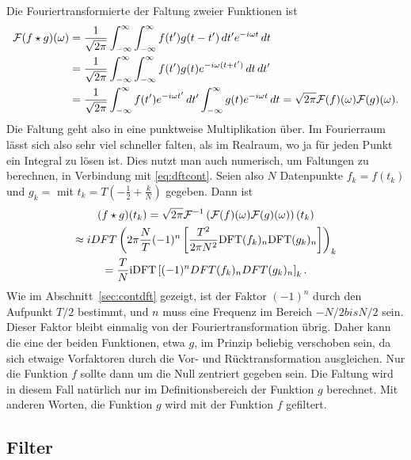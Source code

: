 Die Fouriertransformierte der Faltung zweier Funktionen ist
\begin{equation}
  \label{eq:fourierfaltung}
  \begin{split}
    \mathcal F(f\star g)(\omega) &=
    \frac{1}{\sqrt{2\pi}}\int_{-\infty}^{\infty}
    \int_{-\infty}^{\infty} f(t')g(t-t')\,dt' e^{-i \omega t}\,
    dt\\
    &= \frac{1}{\sqrt{2\pi}}\int_{-\infty}^{\infty}
    \int_{-\infty}^{\infty} f(t') g(t) e^{-i \omega (t+t')}\, dt\,
    dt'\\
    &= \frac{1}{\sqrt{2\pi}} \int_{-\infty}^{\infty} f(t')e^{-i
      \omega t'}\, dt' \int_{-\infty}^{\infty} g(t) e^{-i \omega
      t}\, dt = \sqrt{2\pi}\mathcal F(f)(\omega)\mathcal F(g)(\omega).
  \end{split}
\end{equation}
Die Faltung geht also in eine punktweise Multiplikation über. Im
Fourierraum lässt sich also sehr viel schneller falten, als im
Realraum, wo ja für jeden Punkt ein Integral zu lösen ist. Dies nutzt
man auch numerisch, um Faltungen zu berechnen, in Verbindung mit
\eqref{eq:dftcont}. Seien also $N$ Datenpunkte $f_k = f(t_k)$ und $g_k
= $ mit $t_k = T\left(-\frac{1}{2} + \frac{k}{N}\right)$ gegeben. Dann
ist
\begin{multline}
  \label{eq:discretefold}
  (f\star g)(t_k) =
  \sqrt{2\pi}\mathcal F^{-1}\left(\mathcal F(f)(\omega)\mathcal F(g)(\omega)\right)(t_k)\\
  \approx
  iDFT\left(2\pi \frac{N}{T} (-1)^n
  \left[\frac{T^2}{2\pi N^2}\text{DFT}(f_k)_n\text{DFT}(g_k)_n\right]\right)_k\\
  =
  \frac{T}{N} \text{iDFT}\left[(-1)^n DFT(f_k)_n DFT(g_k)_n\right]_k.
\end{multline}
Wie im Abschnitt~\ref{sec:contdft} gezeigt, ist der Faktor $(-1)^n$
durch den Aufpunkt $T/2$ bestimmt, und $n$ muss eine Frequenz im
Bereich $-N/2 bis N/2$ sein. Dieser Faktor bleibt einmalig von der
Fouriertransformation übrig. Daher kann die eine der beiden
Funktionen, etwa $g$, im Prinzip beliebig verschoben sein, da sich
etwaige Vorfaktoren durch die Vor- und Rücktransformation
ausgleichen. Nur die Funktion $f$ sollte dann um die Null zentriert
gegeben sein. Die Faltung wird in diesem Fall natürlich nur im
Definitionsbereich der Funktion $g$ berechnet. Mit anderen Worten, die
Funktion $g$ wird mit der Funktion $f$ gefiltert.

\subsection{Filter}

